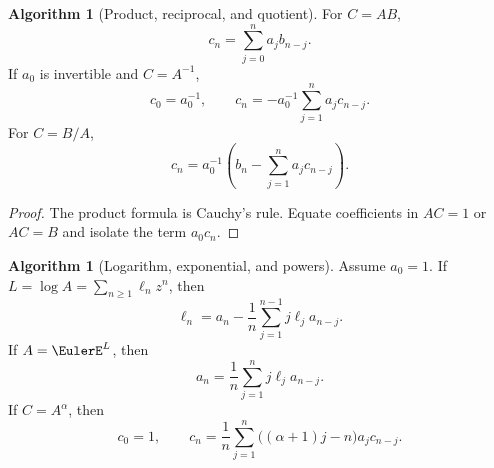 \documentclass[11pt,a4paper,oneside,openany]{book}
\theoremstyle{definition}
\newtheorem{algorithm}[theorem]{Algorithm}
\theoremstyle{remark}
\begin{document}
\begin{algorithm}[Product, reciprocal, and quotient]
\label{alg:merged-product-quotient}
For $C=AB$,
\begin{equation}
 c_n=\sum_{j=0}^{n}a_jb_{n-j}.                                     \label{eq:merged-alg-product}
\end{equation}
If $a_0$ is invertible and $C=A^{-1}$,
\begin{equation}
 c_0=a_0^{-1},\qquad
 c_n=-a_0^{-1}\sum_{j=1}^{n}a_jc_{n-j}.                            \label{eq:merged-alg-reciprocal}
\end{equation}
For $C=B/A$,
\begin{equation}
 c_n=a_0^{-1}\left(b_n-\sum_{j=1}^{n}a_jc_{n-j}\right).            \label{eq:merged-alg-quotient}
\end{equation}
\end{algorithm}

\begin{proof}
The product formula is Cauchy's rule.  Equate coefficients in $AC=1$ or
$AC=B$ and isolate the term $a_0c_n$.
\end{proof}

\begin{algorithm}[Logarithm, exponential, and powers]
\label{alg:merged-exp-log-power}
Assume $a_0=1$.  If $L=\log A=\sum_{n\geq1}\ell_nz^n$, then
\begin{equation}
 \ell_n=a_n-\frac1n\sum_{j=1}^{n-1}j\ell_ja_{n-j}.                 \label{eq:merged-alg-log}
\end{equation}
If $A=\EulerE^L$, then
\begin{equation}
 a_n=\frac1n\sum_{j=1}^{n}j\ell_ja_{n-j}.                         \label{eq:merged-alg-exp}
\end{equation}
If $C=A^\alpha$, then
\begin{equation}
 c_0=1,\qquad
 c_n=\frac1n\sum_{j=1}^{n}\bigl((\alpha+1)j-n\bigr)a_jc_{n-j}.    \label{eq:merged-alg-power}
\end{equation}
\end{algorithm}
\end{document}
